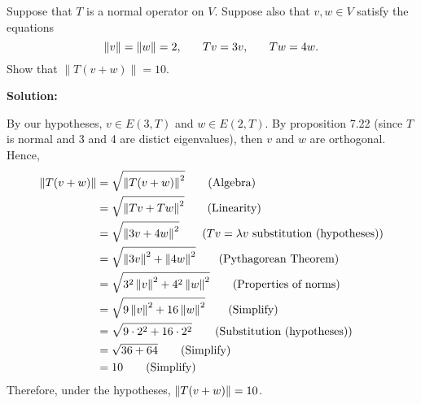 Suppose that $T$ is a normal operator on $V$.  Suppose also that $v, w \in V$ satisfy the equations
    \[
        \|v\| = \|w\| = 2, \hspace{.25in} Tv=3v, \hspace{.25in} Tw=4w.
    \]
    Show that $\|T(v+w)\| = 10$.

    \nnl \textbf{Solution: }

    \nl By our hypotheses, $v \in E(3,T)$ and $w \in E(2,T)$. By proposition 7.22 (since $T$ is normal and 3 and 4 are distict eigenvalues), then $v$ and $w$ are orthogonal. Hence,
    \begin{align*}
        \left\| {T(v+w)} \right\| &= \sqrt{\left\| {T(v+w)} \right\|^2} \tag{Algebra} \\
        &= \sqrt{ \left\| {Tv + Tw} \right\|^2} \tag{Linearity}\\
        &= \sqrt{\left\| {3v + 4w} \right\|^2} \tag{$Tv = \lambda v$ substitution (hypotheses)}\\
        &= \sqrt{\left\| {3v} \right\|^2 + \left\| {4w} \right\|^2} \tag{Pythagorean Theorem}\\
        &= \sqrt{ 3^2 \left\| {v} \right\|^2 + 4^2 \left\| {w} \right\|^2} \tag{Properties of norms}\\
        &= \sqrt{ 9 \left\| {v} \right\|^2 + 16 \left\| {w} \right\|^2} \tag{Simplify}\\
        &= \sqrt{ 9 \cdot 2^2 + 16 \cdot 2^2} \tag{Substitution (hypotheses)}\\
        &= \sqrt{ 36 + 64 } \tag{Simplify}\\
        &= 10 \tag{Simplify}
    \end{align*}
    Therefore, under the hypotheses, $\left\| {T(v+w)} \right\| = 10$.